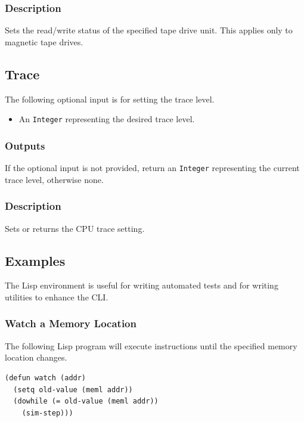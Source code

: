 \documentclass[10pt, openany]{book}
\newcommand{\datatype}[1]{\texttt{#1}}
\begin{document}
\subsubsection{Description}
Sets the read/write status of the specified tape drive unit.
This applies only to magnetic tape drives.

\subsection{Trace}
The following optional input is for setting the trace level.
\begin{itemize}
  \item An \datatype{Integer} representing the desired trace level.
\end{itemize}
\subsubsection{Outputs}
If the optional input is not provided, return an \datatype{Integer} representing the current trace level, otherwise none.
\subsubsection{Description}
Sets or returns the CPU trace setting.

\subsection{Examples}
The Lisp environment is useful for writing automated tests and for writing utilities to enhance the CLI.
\subsubsection{Watch a Memory Location}
The following Lisp program will execute instructions until the specified memory location changes.
\lstset{language=[Tiny]Lisp}
\begin{lstlisting}
(defun watch (addr)
  (setq old-value (meml addr))
  (dowhile (= old-value (meml addr))
    (sim-step)))
\end{lstlisting}

\clearpage
{}
\nocite{dec84}


\end{document}
